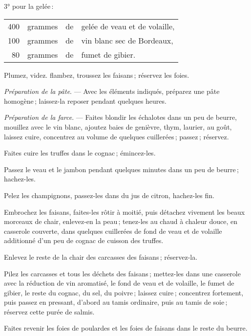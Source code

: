 3° pour la gelée :

\footnotesize
\begin{longtable}{rrrp{16em}}
    400 & grammes & de & gelée de veau et de volaille,                                                    \\
    100 & grammes & de & vin blanc sec de Bordeaux,                                                       \\
     80 & grammes & de & fumet de gibier.                                                                 \\
\end{longtable}
\normalsize

Plumez, videz. flambez, troussez les faisans ; réservez les foies.

\medskip

\textit{Préparation de la pâte}. — Avec les éléments indiqués, préparez une
pâte homogène ; laissez-la reposer pendant quelques heures.

\medskip

\textit{Préparation de la farce}. — Faites blondir les échalotes dans un peu de
beurre, mouillez avec le vin blanc, ajoutez baies de genièvre, thym, laurier,
au goût, laissez cuire, concentrez au volume de quelques cuillerées ; passez ;
réservez.

Faites cuire les truffes dans le cognac ; émincez-les.

Passez le veau et le jambon pendant quelques minutes dans un peu de beurre ;
hachez-les.

Pelez les champignons, passez-les dans du jus de citron, hachez-les fin.

Embrochez les faisans, faites-les rôtir à moitié, puis détachez vivement les
beaux morceaux de chair, enlevez-en la peau ; tenez-les au chaud à chaleur
douce, en casserole couverte, dans quelques cuillerées de fond de veau et de
volaille additionné d'un peu de cognac de cuisson des truffes.

Enlevez le reste de la chair des carcasses des faisans ; réservez-la.

Pilez les carcasses et tous les déchets des faisans ; mettez-les dans une
casserole avec la réduction de vin aromatisé, le fond de veau et de volaille,
le fumet de gibier, le reste du cognac, du sel, du poivre ; laissez cuire ;
concentrez fortement, puis passez en pressant, d'abord au tamis ordinaire, puis
au tamis de soie ; réservez cette purée de salmis.

Faites revenir les foies de poulardes et les foies de faisans dans le reste du
beurre.

